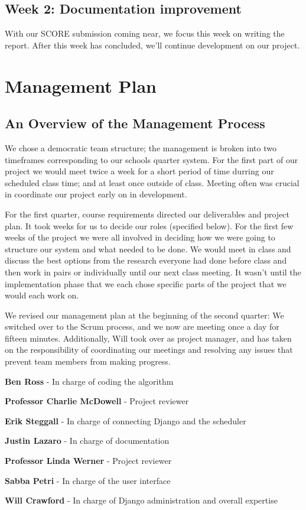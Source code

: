 \documentclass[12pt]{article}
\begin{document}
\begin{enumerate}
\subsection*{Week 2: Documentation improvement}

With our SCORE submission coming near, we focus this week on writing the report. After this week has concluded, we'll continue development on our project.

\section{Management Plan} %

\subsection{An Overview of the Management Process}
We chose a democratic team structure; the management is broken into two timeframes corresponding to our schools quarter system. For the first part of our project we would meet twice a week for a short period of time durring our scheduled class time; and at least once outside of class. Meeting often was crucial in coordinate our project early on in development.

For the first quarter, course requirements directed our deliverables and project plan. It took weeks for us to decide our roles (specified below). For the first few weeks of the project we were all involved in deciding how we were going to structure our system and what needed to be done. We would meet in class and discuss the best options from the research everyone had done before class and then work in pairs or individually until our next class meeting. It wasn't until the implementation phase that we each chose specific parts of the project that we would each work on. 
 
We revised our management plan at the beginning of the second quarter: We switched over to the Scrum process, and we now are meeting once a day for fifteen minutes. Additionally, Will took over as project manager, and has taken on the responsibility of coordinating our meetings and resolving any issues that prevent team members from making progress. 
	
\begin{description}
\item{\textbf{Ben Ross}} - In charge of coding the algorithm
\item{\textbf{Professor Charlie McDowell}} - Project reviewer
\item{\textbf{Erik Steggall}} - In charge of connecting Django and the scheduler
\item{\textbf{Justin Lazaro}} - In charge of documentation
\item{\textbf{Professor Linda Werner}} - Project reviewer
\item{\textbf{Sabba Petri}} - In charge of the user interface
\item{\textbf{Will Crawford}} - In charge of Django administration and overall expertise
\end{description}


\end{enumerate}
\end{document}
